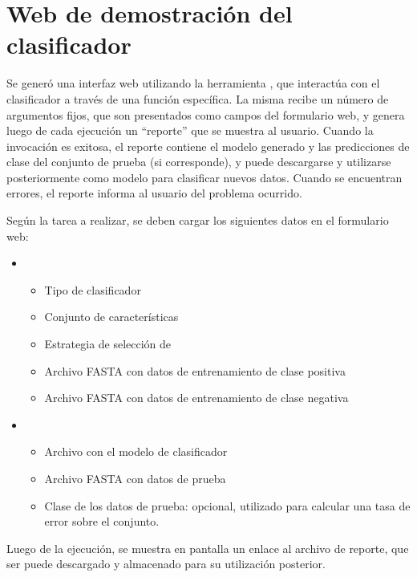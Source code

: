 %
%
\section{Web de demostración del clasificador}
%
Se generó una interfaz web utilizando la herramienta \eng{\webdemo{}}
\cite{webdemobuilder}, que interactúa con el clasificador a través de
una función específica.
La misma recibe un número de argumentos fijos, que son presentados
como campos del formulario web, y genera luego de cada ejecución un
``reporte'' que se muestra al usuario.
Cuando la invocación es exitosa, el reporte contiene el modelo
generado y las predicciones de clase del conjunto de prueba (si
corresponde), y puede descargarse y utilizarse posteriormente como
modelo para clasificar nuevos datos.
Cuando se encuentran errores, el reporte informa al usuario del
problema ocurrido.

Según la tarea a realizar, se deben cargar los siguientes datos en el
formulario web:
%
\begin{itemize}
\item
  \begin{itemize}
  \item
    Tipo de clasificador
  \item
    Conjunto de características
  \item
    Estrategia de selección de 
  \item
    Archivo FASTA con datos de entrenamiento de clase positiva
  \item
    Archivo FASTA con datos de entrenamiento de clase negativa
  \end{itemize}
\item
  \begin{itemize}
  \item
    Archivo con el modelo de clasificador
  \item
    Archivo FASTA con datos de prueba
  \item
    Clase de los datos de prueba: opcional, utilizado para calcular
    una tasa de error sobre el conjunto.
  \end{itemize}
\end{itemize}
%
Luego de la ejecución, se muestra en pantalla un enlace al archivo de
reporte, que ser puede descargado y almacenado para su utilización
posterior.
